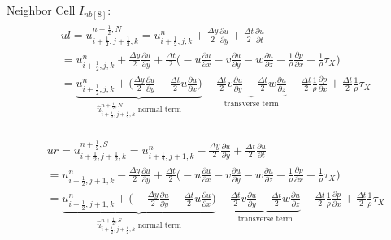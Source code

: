 \documentclass{article}
\numberwithin{equation}{subsection}
\begin{document}
Neighbor Cell $I_{nb[8]}$:
\begin{align}
\begin{split}
& ul = u_{i+\frac{1}{2},j+\frac{1}{2},k}^{n+\frac{1}{2},N} = u_{i+\frac{1}{2},j,k}^n + \frac{\Delta y}{2}\frac{\partial u}{\partial y} + \frac{\Delta t}{2}\frac{\partial u}{\partial t} \\
&= u_{i+\frac{1}{2},j,k}^n + \frac{\Delta y}{2} \frac{\partial u}{\partial y} + \frac{\Delta t}{2} \Big( -u\frac{\partial u}{\partial x} -v\frac{\partial u}{\partial y} -w\frac{\partial u}{\partial z} - \frac{1}{\rho}\frac{\partial p}{\partial x} +\frac{1}{\rho}\tau_X\Big) \\
&= \underbrace{u_{i+\frac{1}{2},j,k}^n + \Big(\frac{\Delta y}{2}\frac{\partial u}{\partial y} - \frac{\Delta t}{2} u\frac{\partial u}{\partial x}\Big)}_\text{$\widehat{u}_{i+\frac{1}{2},j+\frac{1}{2},k}^{n+\frac{1}{2},N}$ normal term} -\underbrace{\frac{\Delta t}{2}v\frac{\partial u}{\partial y} - \frac{\Delta t}{2}w\frac{\partial u}{\partial z}}_\text{transverse term} - \frac{\Delta t}{2}\frac{1}{\rho}\frac{\partial p}{\partial x} + \frac{\Delta t}{2}\frac{1}{\rho}\tau_X
\end{split}
\end{align}

\begin{align}
\begin{split}
& ur = u_{i+\frac{1}{2},j+\frac{1}{2},k}^{n+\frac{1}{2},S} = u_{i+\frac{1}{2},j+1,k}^n - \frac{\Delta y}{2}\frac{\partial u}{\partial y} + \frac{\Delta t}{2}\frac{\partial u}{\partial t} \\
&= u_{i+\frac{1}{2},j+1,k}^n - \frac{\Delta y}{2} \frac{\partial u}{\partial y} + \frac{\Delta t}{2} \Big( -u\frac{\partial u}{\partial x} -v\frac{\partial u}{\partial y} -w\frac{\partial u}{\partial z} - \frac{1}{\rho}\frac{\partial p}{\partial x} +\frac{1}{\rho}\tau_X\Big) \\
&= \underbrace{u_{i+\frac{1}{2},j+1,k}^n + \Big(-\frac{\Delta y}{2}\frac{\partial u}{\partial y} - \frac{\Delta t}{2} u\frac{\partial u}{\partial x}\Big)}_\text{$\widehat{u}_{i+\frac{1}{2},j+\frac{1}{2},k}^{n+\frac{1}{2},S}$ normal term} -\underbrace{\frac{\Delta t}{2}v\frac{\partial u}{\partial y} - \frac{\Delta t}{2}w\frac{\partial u}{\partial z}}_\text{transverse term} - \frac{\Delta t}{2}\frac{1}{\rho}\frac{\partial p}{\partial x} + \frac{\Delta t}{2}\frac{1}{\rho}\tau_X
\end{split}
\end{align}
\end{document}
